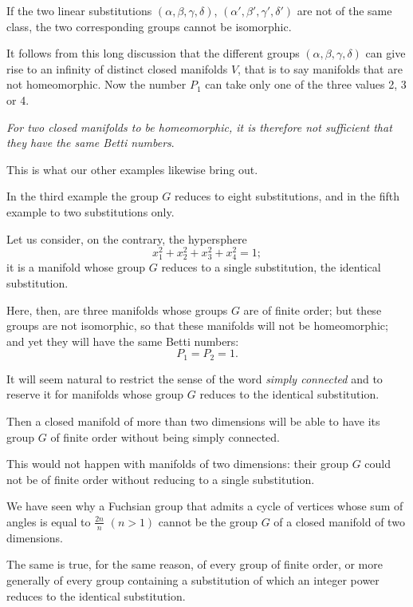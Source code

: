 \documentclass{article}
\begin{document}
If the two linear substitutions $(\alpha, \beta, \gamma, \delta)$, $(\alpha', \beta', \gamma', \delta')$ are not of the same class, the two corresponding groups cannot be isomorphic.

It follows from this long discussion that the different groups $(\alpha, \beta, \gamma, \delta)$ can give rise to an infinity of distinct closed manifolds $V$, that is to say manifolds that are not homeomorphic. Now the number $P_{1}$ can take only one of the three values 2, 3 or 4.

\emph{For two closed manifolds to be homeomorphic, it is therefore not sufficient that they have the same Betti numbers}.

This is what our other examples likewise bring out.

In the third example the group $G$ reduces to eight substitutions, and in the fifth example to two substitutions only.

Let us consider, on the contrary, the hypersphere
\[ x^{2}_{1} + x^{2}_{2} + x^{2}_{3} + x^{2}_{4} = 1; \]
it is a manifold whose group $G$ reduces to a single substitution, the identical substitution.

Here, then, are three manifolds whose groups $G$ are of finite order; but these groups are not isomorphic, so that these manifolds will
not be homeomorphic; and yet they will have the same Betti numbers:
\[ P_{1} = P_{2} = 1. \]

It will seem natural to restrict the sense of the word \emph{simply connected} and to reserve it for manifolds whose group $G$ reduces to the identical substitution.

Then a closed manifold of more than two dimensions will be able to have its group $G$ of finite order without being simply connected.

This would not happen with manifolds of two dimensions: their group $G$ could not be of finite order without reducing to a single substitution.

We have seen why a Fuchsian group that admits a cycle of vertices whose sum of angles is equal to $\frac{2n}{n}$ $(n > 1)$ cannot be the group $G$ of a closed manifold of two dimensions.

The same is true, for the same reason, of every group of finite order, or more generally of every group containing a substitution of which an integer power reduces to the identical substitution.
\end{document}
